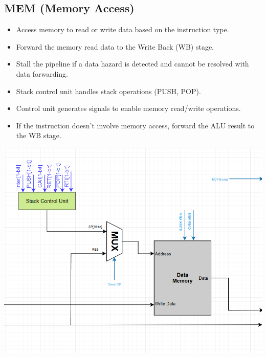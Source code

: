 \documentclass{report}
\begin{document}
\subsection*{MEM (Memory Access)}
\begin{minipage}{0.6\textwidth}
\begin{itemize}
    \item Access memory to read or write data based on the instruction type.
    \item Forward the memory read data to the Write Back (WB) stage.
    \item Stall the pipeline if a data hazard is detected and cannot be resolved with data forwarding.
    \item Stack control unit handles stack operations (PUSH, POP).
    \item Control unit generates signals to enable memory read/write operations.
    \item If the instruction doesn't involve memory access, forward the ALU result to the WB stage.
\end{itemize}
\end{minipage}
\begin{minipage}{0.35\textwidth}
\begin{center}
    \includegraphics[width=\textwidth]{./assets/MEM.png}
\end{center}
\end{minipage}
\end{document}
